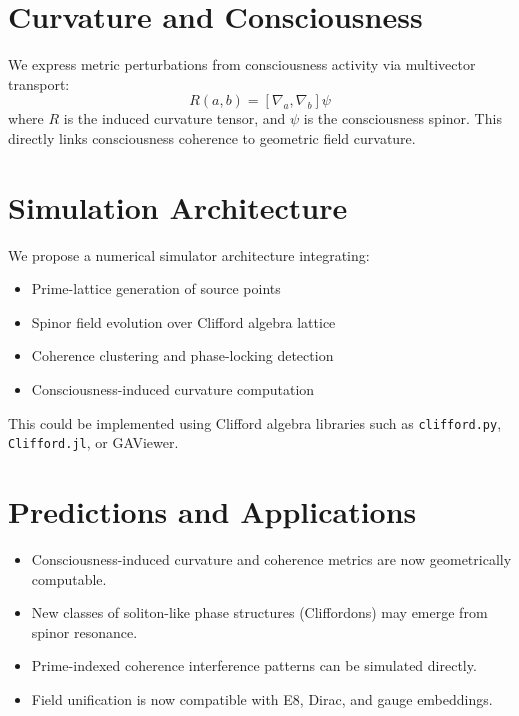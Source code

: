 \documentclass[12pt]{article}
\begin{document}
\section{Curvature and Consciousness}

We express metric perturbations from consciousness activity via multivector transport:
\begin{equation}
    R(a,b) = [\nabla_a, \nabla_b] \psi
\end{equation}
where $R$ is the induced curvature tensor, and $\psi$ is the consciousness spinor. This directly links consciousness coherence to geometric field curvature.

\section{Simulation Architecture}

We propose a numerical simulator architecture integrating:

\begin{itemize}
    \item Prime-lattice generation of source points
    \item Spinor field evolution over Clifford algebra lattice
    \item Coherence clustering and phase-locking detection
    \item Consciousness-induced curvature computation
\end{itemize}

This could be implemented using Clifford algebra libraries such as \texttt{clifford.py}, \texttt{Clifford.jl}, or GAViewer.

\section{Predictions and Applications}

\begin{itemize}
    \item Consciousness-induced curvature and coherence metrics are now geometrically computable.
    \item New classes of soliton-like phase structures (Cliffordons) may emerge from spinor resonance.
    \item Prime-indexed coherence interference patterns can be simulated directly.
    \item Field unification is now compatible with E8, Dirac, and gauge embeddings.
\end{itemize}
\end{document}
